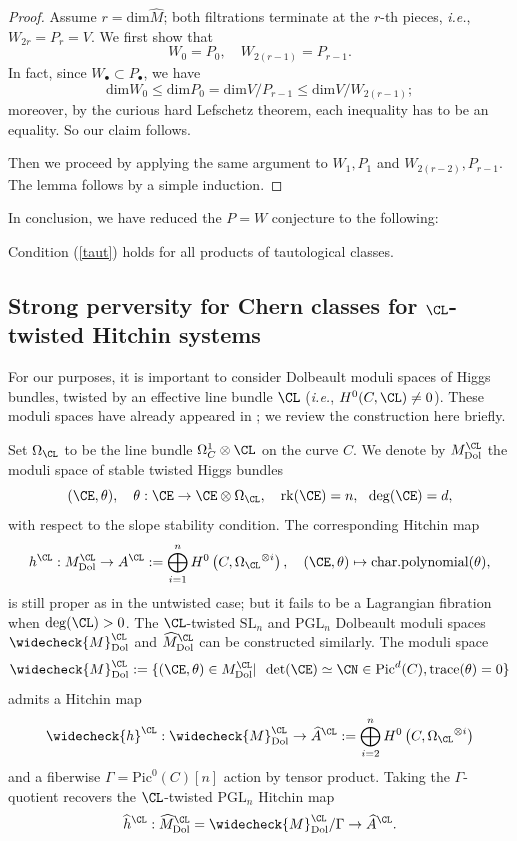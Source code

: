 \begin{proof}
Assume $r = \mathrm{dim}\widehat{M}$; both filtrations terminate at the $r$-th pieces, \emph{i.e.}, $W_{2r} = P_{r} = V$. We first show that
\[
W_0 = P_0, \quad W_{2(r-1)} = P_{r-1}.
\]
In fact, since $W_\bullet  \subset P_\bullet$, we have
\[
\mathrm{dim} W_0 \leq \mathrm{dim} P_0 = \mathrm{dim}V/P_{r-1} \leq \mathrm{dim} V/W_{2(r-1)};
\]
moreover, by the curious hard Lefschetz theorem, each inequality has to be an equality. So our claim follows.

Then we proceed by applying the same argument to $W_1, P_1$ and $W_{2(r-2)}, P_{r-1}$. The lemma follows by a simple induction.
\end{proof}


In conclusion, we have reduced the $P=W$ conjecture to the following:


\begin{conj}[Equivalent version of P=W]
\notready\label{conj2.2}
Condition (\ref{taut}) holds for all products of tautological classes.
\end{conj}

\subsection{Strong perversity for Chern classes for $\CL$-twisted Hitchin systems}

For our purposes, it is important to consider Dolbeault moduli spaces of Higgs bundles, twisted by an effective line bundle $\CL$ (\emph{i.e.}, $H^0(C, \CL) \neq 0$). These moduli spaces have already appeared in \cite{CL,HT2,HT,Yun1,Yun2}; we review the construction here briefly.

Set $\Omega_\CL$ to be the line bundle $\Omega^1_C \otimes \CL$ on the curve $C$. We denote by $M^\CL_{\mathrm{Dol}}$ the moduli space of stable twisted Higgs bundles
\[
(\CE, \theta), \quad \theta: \CE \to \CE \otimes\Omega_\CL, \quad \mathrm{rk}(\CE) = n, ~~\mathrm{deg}(\CE)=d,
\]
with respect to the slope stability condition. The corresponding Hitchin map
\[
h^\CL: M^\CL_{\mathrm{Dol}} \to A^\CL: = \bigoplus_{i=1}^n H^0\left(C, {\Omega_\CL}^{\otimes i} \right) ,\quad (\CE, \theta) \mapsto \mathrm{char.polynomial}(\theta),
\]
is still proper as in the untwisted case; but it fails to be a Lagrangian fibration when $\mathrm{deg}(\CL)>0$. The $\CL$-twisted $\mathrm{SL}_n$ and $\mathrm{PGL}_n$ Dolbeault moduli spaces $\widecheck{M}^\CL_{\mathrm{Dol}}$ and $\widehat{M}^\CL_{\mathrm{Dol}}$ can be constructed similarly. The moduli space
\[
\widecheck{M}^\CL_{\mathrm{Dol}}:= \{(\CE, \theta) \in M^\CL_{\mathrm{Dol}}|~~ \mathrm{det}(\CE) \simeq \CN \in \mathrm{Pic}^d(C), \mathrm{trace}(\theta) = 0\}
\]
admits a Hitchin map
\[
\widecheck{h}^\CL: \widecheck{M}^\CL_{\mathrm{Dol}} \to \widehat{A}^\CL:= \bigoplus_{i=2}^nH^0\left(C, {\Omega_\CL}^{\otimes i} \right)\]
and a fiberwise $\Gamma = \mathrm{Pic}^0(C)[n]$ action by tensor product. Taking the $\Gamma$-quotient recovers the $\CL$-twisted $\mathrm{PGL}_n$ Hitchin map
\[
\widehat{h}^\CL: \widehat{M}^\CL_{\mathrm{Dol}} =\widecheck{M}^\CL_{\mathrm{Dol}}/\Gamma \to \widehat{A}^\CL.
\]


